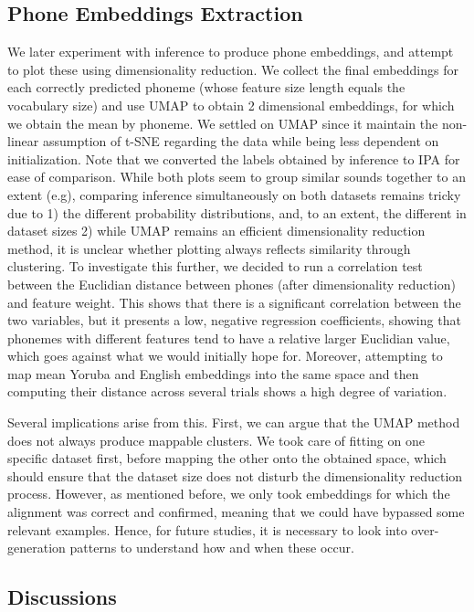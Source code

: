 \documentclass[11pt]{article}
\begin{document}
{\subsection{Phone Embeddings Extraction}
We later experiment with inference to produce phone embeddings, and attempt to plot these using dimensionality reduction. We collect the final embeddings for each correctly predicted phoneme (whose feature size length equals the vocabulary size) and use UMAP to obtain 2 dimensional embeddings, for which we obtain the mean by phoneme. We settled on UMAP since it maintain the non-linear assumption of t-SNE regarding the data while being less dependent on initialization. Note that we converted the labels obtained by inference to IPA for ease of comparison. While both plots seem to group similar sounds together to an extent (e.g), comparing inference simultaneously on both datasets remains tricky due to 1) the different probability distributions, and, to an extent, the different in dataset sizes 2) while UMAP remains an efficient dimensionality reduction method, it is unclear whether plotting always reflects similarity through clustering. 
To investigate this further, we decided to run a correlation test between the Euclidian distance between phones (after dimensionality reduction) and feature weight. This shows that there is a significant correlation between the two variables, but it presents a low, negative regression coefficients, showing that phonemes with different features tend to have a relative larger Euclidian value, which goes against what we would initially hope for. Moreover, attempting to map mean Yoruba and English embeddings into the same space and then computing their distance across several trials shows a high degree of variation.

Several implications arise from this. First, we can argue that the UMAP method does not always produce mappable clusters. We took care of fitting on one specific dataset first, before mapping the other onto the obtained space, which should ensure that the dataset size does not disturb the dimensionality reduction process.  
However, as mentioned before, we only took embeddings for which the alignment was correct and confirmed, meaning that we could have bypassed some relevant examples. Hence, for future studies, it is necessary to look into over-generation patterns to understand how and when these occur. 
\subsection{Discussions}

}
\end{document}

